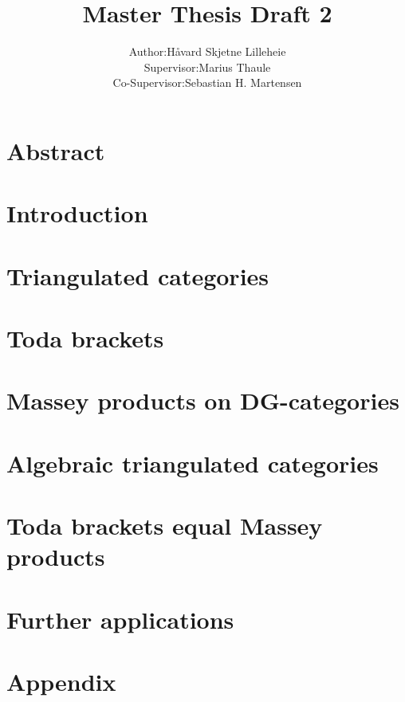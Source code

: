\documentclass[a4paper, 10pt]{article}
\title{Master Thesis Draft 2}
\author{
    \begin{tabular}{rl}
        Author:& Håvard Skjetne Lilleheie\\
        Supervisor:& Marius Thaule\\
        Co-Supervisor:& Sebastian H. Martensen
    \end{tabular}
}
\begin{document}
\maketitle

\tableofcontents

\section*{Abstract}


\section{Introduction}


\section{Triangulated categories}
\label{section:2}


\section{Toda brackets}
\label{section:3}


\section{Massey products on DG-categories}
\label{section:4}


\section{Algebraic triangulated categories}
\label{section:5}


\section{Toda brackets equal Massey products}
\label{section:6}


\section{Further applications}
\label{section:7}


\appendix
\section{Appendix}


{}

\end{document}
